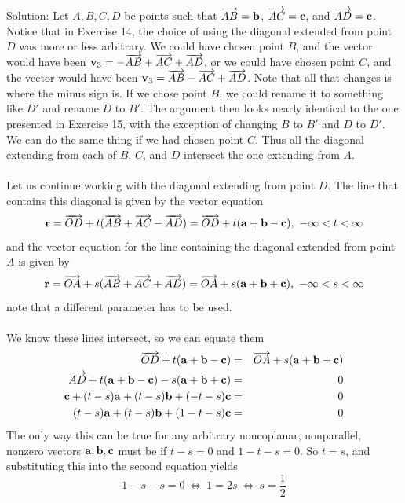 \documentclass[12pt]{amsbook}
\begin{document}
\\
{\sc Solution}: Let $A,B,C,D$ be points such that $\overrightarrow{AB}={\bf b}$, $\overrightarrow{AC}={\bf c}$, and $\overrightarrow{AD}={\bf c}$. Notice that in Exercise 14, the choice of using the diagonal extended from point $D$ was more or less arbitrary. We could have chosen point $B$, and the vector would have been ${\bf v}_3=-\overrightarrow{AB}+\overrightarrow{AC}+\overrightarrow{AD}$, or we could have chosen point $C$, and the vector would have been ${\bf v}_3=\overrightarrow{AB}-\overrightarrow{AC}+\overrightarrow{AD}$. Note that all that changes is where the minus sign is. If we chose point $B$, we could rename it to something like $D'$ and rename $D$ to $B'$. The argument then looks nearly identical to the one presented in Exercise 15, with the exception of changing $B$ to $B'$ and $D$ to $D'$. We can do the same thing if we had chosen point $C$. Thus all the diagonal extending from each of $B$, $C$, and $D$ intersect the one extending from $A$. 
\\
\\
Let us continue working with the diagonal extending from point $D$. The line that contains this diagonal is given by the vector equation
$${\bf r}=\overrightarrow{OD}+t(\overrightarrow{AB}+\overrightarrow{AC}-\overrightarrow{AD})=\overrightarrow{OD}+t({\bf a}+{\bf b}-{\bf c}), \ -\infty <t<\infty$$
and the vector equation for the line containing the diagonal extended from point $A$ is given by
$${\bf r}=\overrightarrow{OA}+s(\overrightarrow{AB}+\overrightarrow{AC}+\overrightarrow{AD})=\overrightarrow{OA}+s({\bf a}+{\bf b}+{\bf c}), \ -\infty <s<\infty$$
note that a different parameter has to be used.
\\
\\
We know these lines intersect, so we can equate them
\begin{eqnarray*}
\overrightarrow{OD}+t({\bf a}+{\bf b}-{\bf c})&=&\overrightarrow{OA}+s({\bf a}+{\bf b}+{\bf c})\\
\overrightarrow{AD}+t({\bf a}+{\bf b}-{\bf c})-s({\bf a}+{\bf b}+{\bf c})&=&0\\
{\bf c}+(t-s){\bf a}+(t-s){\bf b}+(-t-s){\bf c}&=&0\\
(t-s){\bf a}+(t-s){\bf b}+(1-t-s){\bf c}&=&0
\end{eqnarray*}
The only way this can be true for any arbitrary noncoplanar, nonparallel, nonzero vectors ${\bf a},{\bf b},{\bf c}$ must be if $t-s=0$ and $1-t-s=0$. So $t=s$, and substituting this into the second equation yields
$$1-s-s=0  \ \Leftrightarrow \ 1=2s \ \Leftrightarrow \ s=\frac{1}{2}$$ 
\end{document}
